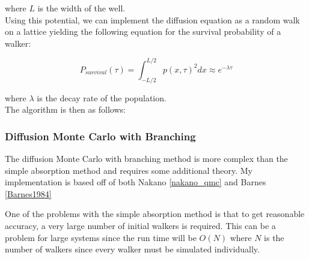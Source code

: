 \documentclass[reqno]{amsart}
\numberwithin{equation}{section}
\numberwithin{figure}{section}
\begin{document}
where $L$ is the width of the well. \\

Using this potential, we can implement the diffusion equation as a random walk on a lattice yielding the following equation for the survival probability of a walker:

\begin{equation}
    P_{survival}(\tau) = \int_{-L/2}^{L/2} p(x, \tau)^2 dx \approx e^{-\lambda \tau}
\end{equation}

where $\lambda$ is the decay rate of the population. \\

The algorithm is then as follows:



\subsubsection{Diffusion Monte Carlo with Branching}

The diffusion Monte Carlo with branching method is more complex than the simple absorption method and requires some additional theory. My implementation is based off of both Nakano \ref{nakano_qmc} and Barnes \ref{Barnes1984}

One of the problems with the simple absorption method is that to get reasonable accuracy, a very large number of initial walkers is required. This can be a problem for large systems since the run time will be $O(N)$ where $N$ is the number of walkers since every walker must be simulated individually. \\
\end{document}
